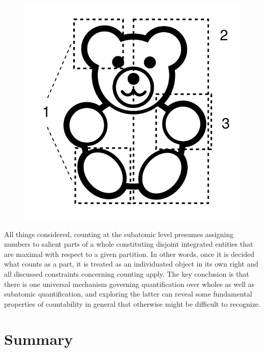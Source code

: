\begin{figure}[h!]
\centering
\includegraphics[scale=0.5]{figures/toy_not-counting-parts.png}
\label{fig:illegal-counting-of-parts}
\end{figure}

All things considered, counting at the subatomic level presumes assigning numbers to salient parts of a whole constituting disjoint integrated entities that are maximal with respect to a given partition. In other words, once it is decided what counts as a part, it is treated as an individuated object in its own right and all discussed constraints concerning counting apply. The key conclusion is that there is one universal mechanism governing quantification over wholes as well as subatomic quantification, and exploring the latter can reveal some fundamental properties of countability in general that otherwise might be difficult to recognize.

\section{Summary}\label{sec:summary-ch5}

